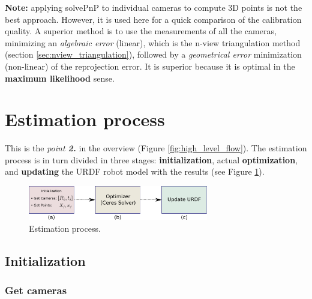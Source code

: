 \noindent
\textbf{Note:} applying solvePnP to individual cameras to compute 3D points is not the best approach. However, it is used here for a quick comparison of the calibration quality. A superior method is to use the measurements of all the cameras, minimizing an \textit{algebraic error} (linear), which is the n-view triangulation method (section \ref{sec:nview_triangulation}), followed by a \textit{geometrical error} minimization (non-linear) of the reprojection error. It is superior because it is optimal in the \textbf{maximum likelihood} sense.

\section{Estimation process}
\label{sec:estimation}

This is the \textit{point \textbf{2.}} in the overview (Figure \ref{fig:high_level_flow}).
The estimation process is in turn divided in three stages: \textbf{initialization}, actual \textbf{optimization}, and \textbf{updating} the URDF robot model with the results (see Figure \ref{fig:optimization}).

\begin{figure}[!htbp]
 \centering
 \includegraphics[width=0.7\textwidth]{images/optimization.pdf}
 \caption{Estimation process.}
 \label{fig:optimization}
\end{figure}

%


\subsection{Initialization}
\label{sec:initialization}

\subsubsection*{Get cameras}

